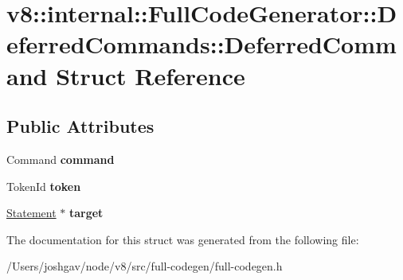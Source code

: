 \hypertarget{structv8_1_1internal_1_1_full_code_generator_1_1_deferred_commands_1_1_deferred_command}{}\section{v8\+:\+:internal\+:\+:Full\+Code\+Generator\+:\+:Deferred\+Commands\+:\+:Deferred\+Command Struct Reference}
\label{structv8_1_1internal_1_1_full_code_generator_1_1_deferred_commands_1_1_deferred_command}
\subsection*{Public Attributes}
\begin{DoxyCompactItemize}
\item 
Command {\bfseries command}\hypertarget{structv8_1_1internal_1_1_full_code_generator_1_1_deferred_commands_1_1_deferred_command_a0bc389cb358b8db0ae6417f7cb302576}{}\label{structv8_1_1internal_1_1_full_code_generator_1_1_deferred_commands_1_1_deferred_command_a0bc389cb358b8db0ae6417f7cb302576}

\item 
Token\+Id {\bfseries token}\hypertarget{structv8_1_1internal_1_1_full_code_generator_1_1_deferred_commands_1_1_deferred_command_a4ccb03ce727f07ef7b1ca1ce4893a99d}{}\label{structv8_1_1internal_1_1_full_code_generator_1_1_deferred_commands_1_1_deferred_command_a4ccb03ce727f07ef7b1ca1ce4893a99d}

\item 
\hyperlink{classv8_1_1internal_1_1_statement}{Statement} $\ast$ {\bfseries target}\hypertarget{structv8_1_1internal_1_1_full_code_generator_1_1_deferred_commands_1_1_deferred_command_a2af69a06ea46701564029f1864977732}{}\label{structv8_1_1internal_1_1_full_code_generator_1_1_deferred_commands_1_1_deferred_command_a2af69a06ea46701564029f1864977732}

\end{DoxyCompactItemize}


The documentation for this struct was generated from the following file\+:\begin{DoxyCompactItemize}
\item 
/\+Users/joshgav/node/v8/src/full-\/codegen/full-\/codegen.\+h\end{DoxyCompactItemize}
